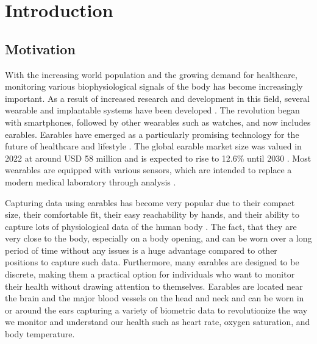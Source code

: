 \chapter{Introduction}
\label{ch:Introduction}

\section{Motivation}
With the increasing world population and the growing demand for healthcare, monitoring various biophysiological signals of the body has become increasingly important. 
As a result of increased research and development in this field, several wearable and implantable systems have been developed \cite{loncar-turukaloLiteratureWearableTechnology2019}.
The revolution began with smartphones, followed by other wearables such as watches, and now includes earables.
Earables have emerged as a particularly promising technology for the future of healthcare and lifestyle \cite{trespGoingDigitalSurvey2016, kirkWearablesRevolutionStandardization2014a}. 
The global earable market size was valued in 2022 at around USD 58 million and is expected to rise to 12.6\% until 2030 \cite{GlobalEarphonesHeadphones}.
Most wearables are equipped with various sensors, which are intended to replace a modern medical laboratory through analysis \cite{loncar-turukaloLiteratureWearableTechnology2019}.

Capturing data using earables has become very popular due to their compact size, their comfortable fit, their easy reachability by hands, and their ability to capture lots of physiological data of the human body \cite{roddigerSensingEarablesSystematic2022a}. 
The fact, that they are very close to the body, especially on a body opening, and can be worn over a long period of time without any issues is a huge advantage compared to other positions to capture such data.
Furthermore, many earables are designed to be discrete, making them a practical option for individuals who want to monitor their health without drawing attention to themselves.
Earables are located near the brain and the major blood vessels on the head and neck and can be worn in or around the ears capturing a variety of biometric data to revolutionize the way we monitor and understand our health such as heart rate, oxygen saturation, and body temperature.

